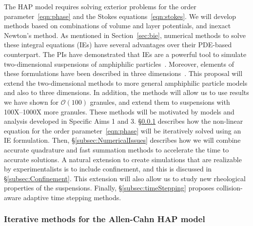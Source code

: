 The HAP model requires solving exterior problems for the order
parameter~\eqref{eqn:phase} and the Stokes equations~\eqref{eqn:stokes}.
We will develop methods based on combinations of volume and layer
potentials, and inexact Newton's method. As mentioned in
Section~\ref{sec:bie}, numerical methods to solve these integral
equations (IEs) have several advantages over their PDE-based
counterpart. The PIs have demonstrated that IEs are a powerful tool to
simulate two-dimensional suspensions of amphiphilic
particles~\cite{Fu2018_SIAM, FuQuRyYo22, fu-ryh-qua-you2022}. Moreover,
elements of these formulations have been described in three
dimensions~\cite{ying_2006, manasthesis, rac-gre2016}. This proposal
will extend the two-dimensional methods to more general amphiphilic
particle models and also to three dimensions. In addition, the methods
will allow us to use results we have shown for $\mathcal{O}(100)$
granules, and extend them to suspensions with 100X--1000X more granules.
These methods will be motivated by models and analysis developed in
Specific Aims 1 and 3. \S\ref{subsec:AC} describes how the non-linear
equation for the order parameter~\eqref{eqn:phase} will be iteratively
solved using an IE formulation. Then, \S\ref{subsec:NumericalIssues}
describes how we will combine accurate quadrature and fast summation
methods to accelerate the time to accurate solutions. A natural
extension to create simulations that are realizable by experimentalists
is to include confinement, and this is discussed in
\S\ref{subsec:Confinement}. This extension will also allow us to study
new rheological properties of the suspensions.  Finally,
\S\ref{subsec:timeStepping} proposes collision-aware adaptive time
stepping methods.

\subsubsection{Iterative methods for the Allen-Cahn HAP model}
\label{subsec:AC}

